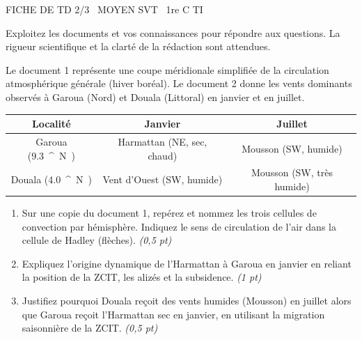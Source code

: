 \documentclass[11pt]{article}
\providecommand{\degree}{^{\circ}}
\begin{document}
\begin{tcolorbox}[enhanced,colback=popink,colframe=popink,arc=10pt,boxrule=0pt,left=12pt,right=12pt,top=9pt,bottom=9pt]
{\color{white}\popxbold\small FICHE DE TD 2/3 \textbullet\ MOYEN \hfill SVT \textbullet\ 1re C TI\par}
\end{tcolorbox}
\vspace{4pt}
\noindent Exploitez les documents et vos connaissances pour répondre aux questions. La rigueur scientifique et la clarté de la rédaction sont attendues.

\begin{exercice}
\label{exo:cellules}
Le document 1 représente une coupe méridionale simplifiée de la circulation atmosphérique générale (hiver boréal). Le document 2 donne les vents dominants observés à Garoua (Nord) et Douala (Littoral) en janvier et en juillet.

\begin{center}
\begin{tabular}{|c|c|c|}
\hline
\textbf{Localité} & \textbf{Janvier} & \textbf{Juillet} \\ \hline
Garoua (\SI{9,3}{\degree}N) & Harmattan (NE, sec, chaud) & Mousson (SW, humide) \\ \hline
Douala (\SI{4,0}{\degree}N) & Vent d'Ouest (SW, humide) & Mousson (SW, très humide) \\ \hline
\end{tabular}
\end{center}

\begin{enumerate}
    \item Sur une copie du document 1, repérez et nommez les trois cellules de convection par hémisphère. Indiquez le sens de circulation de l'air dans la cellule de Hadley (flèches). \textit{(0,5 pt)}
    \item Expliquez l'origine dynamique de l'Harmattan à Garoua en janvier en reliant la position de la ZCIT, les alizés et la subsidence. \textit{(1 pt)}
    \item Justifiez pourquoi Douala reçoit des vents humides (Mousson) en juillet alors que Garoua reçoit l'Harmattan sec en janvier, en utilisant la migration saisonnière de la ZCIT. \textit{(0,5 pt)}
\end{enumerate}
\end{exercice}
\end{document}
